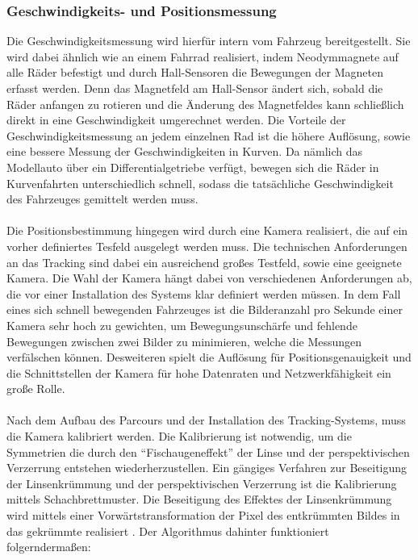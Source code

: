 \subsubsection{Geschwindigkeits- und Positionsmessung}
Die Geschwindigkeitsmessung wird hierfür intern vom Fahrzeug bereitgestellt. Sie wird dabei ähnlich wie an einem Fahrrad realisiert, indem Neodymmagnete auf alle Räder befestigt und durch Hall-Sensoren die Bewegungen der Magneten erfasst werden. Denn das Magnetfeld am Hall-Sensor ändert sich, sobald die Räder anfangen zu rotieren und die Änderung des Magnetfeldes kann schließlich direkt in eine Geschwindigkeit umgerechnet werden. Die Vorteile der Geschwindigkeitsmessung an jedem einzelnen Rad ist die höhere Auflösung, sowie eine bessere Messung der Geschwindigkeiten in Kurven. Da nämlich das Modellauto über ein Differentialgetriebe verfügt, bewegen sich die Räder in Kurvenfahrten unterschiedlich schnell, sodass die tatsächliche Geschwindigkeit des Fahrzeuges gemittelt werden muss.\\ \\
Die Positionsbestimmung hingegen wird durch eine Kamera realisiert, die auf ein vorher definiertes Tesfeld ausgelegt werden muss. Die technischen Anforderungen an das Tracking sind dabei ein ausreichend großes Testfeld, sowie eine geeignete Kamera. Die Wahl der Kamera hängt dabei von verschiedenen Anforderungen ab, die vor einer Installation des Systems klar definiert werden müssen. In dem Fall eines sich schnell bewegenden Fahrzeuges ist die Bilderanzahl pro Sekunde einer Kamera sehr hoch zu gewichten, um Bewegungsunschärfe und fehlende Bewegungen zwischen zwei Bilder zu minimieren, welche die Messungen verfälschen können. Desweiteren spielt die Auflösung für Positionsgenauigkeit und die Schnittstellen der Kamera für hohe Datenraten und Netzwerkfähigkeit ein große Rolle. \\ \\
Nach dem Aufbau des Parcours und der Installation des Tracking-Systems, muss die Kamera kalibriert werden. Die Kalibrierung ist notwendig, um die Symmetrien die durch den "`Fischaugeneffekt"' der Linse und der perspektivischen Verzerrung entstehen wiederherzustellen. Ein gängiges Verfahren zur Beseitigung der Linsenkrümmung und der perspektivischen Verzerrung ist die Kalibrierung mittels Schachbrettmuster. Die Beseitigung des Effektes der Linsenkrümmung wird mittels einer Vorwärtstransformation der Pixel des entkrümmten Bildes in das gekrümmte realisiert \cite{Zhang}. Der Algorithmus dahinter funktioniert folgerndermaßen:\par\medskip
